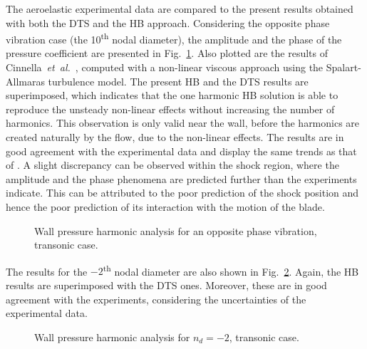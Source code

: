 The aeroelastic experimental data are compared to the present results
obtained with both the DTS and the HB approach.  Considering the opposite phase vibration case (the 10\textsuperscript{th} nodal diameter), 
the amplitude and the
phase of the pressure coefficient are presented in
Fig.~\ref{fig:stcf11_ael_transonic_ibpa_180_paper}. Also plotted are the results of
Cinnella~\emph{et~al.}~\cite{Cinnella2004}, computed with a non-linear viscous
approach using the Spalart-Allmaras turbulence model. The present HB and the DTS
results are superimposed, which indicates that the one harmonic HB solution is able
to reproduce the unsteady non-linear effects without increasing the
number of harmonics. This observation is only valid near the wall,
before the harmonics are created naturally by the flow, due to the
non-linear effects. The results are in good agreement with
the experimental data and display the same trends as that of
\citet{Cinnella2004}. A slight discrepancy can be observed within the shock
region, where the amplitude and the phase phenomena are predicted
further than the experiments indicate.  This can be attributed to the poor
prediction of the shock position and hence the poor prediction
of its interaction with the motion of the blade.
\begin{figure}[htb]
  \centering
  \caption{Wall pressure harmonic analysis for an opposite phase vibration, transonic case.}
  \label{fig:stcf11_ael_transonic_ibpa_180_paper}
\end{figure}

The results for the $-2$\textsuperscript{th} nodal diameter are also shown in
Fig.~\ref{fig:stcf11_ael_transonic_ibpa_324_paper}. Again,
the HB results are superimposed with the DTS ones. Moreover, these are in
good agreement with the experiments, considering the uncertainties of
the experimental data.
\begin{figure}[htb]
  \centering
  \caption{Wall pressure harmonic analysis for \mbox{$n_d=-2$}, transonic case.}
  \label{fig:stcf11_ael_transonic_ibpa_324_paper}
\end{figure}

